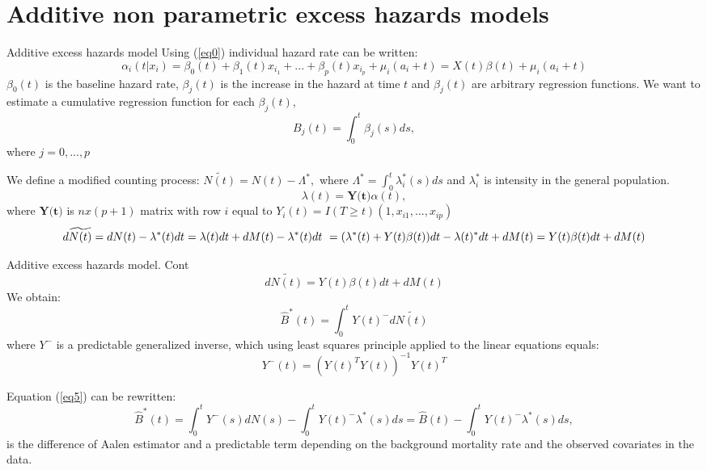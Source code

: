\documentclass{beamer}
\begin{document}
\section{Additive non parametric excess hazards models}
\begin{frame}{Additive excess hazards model}
Using (\ref{eq0}) individual hazard rate can be written:
$$\alpha_i(t|x_i) = \beta_0(t) + \beta_1(t)x_{i_1} + ... + \beta_p(t)x_{i_p} + \mu_i(a_i + t) = X(t)\beta(t) + \mu_i(a_i + t) $$
$\beta_0(t)$ is the baseline hazard rate, 
$\beta_j(t)$ is the increase in the hazard at time $t$
and $\beta_j(t)$ are arbitrary regression functions.
We want to estimate a cumulative regression function for each $\beta_j(t)$, $$B_j(t) = \int_0^t \beta_j(s)ds,$$ where $j=0,...,p$
\end{frame}

\begin{frame}
We define a modified counting process:
$\widetilde{N(t)} = N(t) - \Lambda^*,$ where
$\Lambda^* = \int_0^t \lambda_i^*(s)ds$ and $\lambda_i^*$ is intensity in the general population.
$$\lambda(t) = \textbf{Y(t)} \alpha(t),$$
where $\textbf{Y(t)}$ is $n x (p+1)$ matrix with row $i$ equal to $Y_i(t) = I(T \geq t)(1,x_{i1},...,x_{ip})$ 
\newline
$$d\widetilde{N(t)} = dN(t) - \lambda^*(t)dt = \lambda(t)dt + dM(t)- \lambda^*(t)dt \\\
= (\lambda^*(t) + Y(t)\beta(t))dt - \lambda(t)^*dt + dM(t) = Y(t)\beta(t)dt + dM(t)$$
\newline
\newline
\end{frame}

\begin{frame}{Additive excess hazards model. Cont}
$$d\widetilde{N(t)} = Y(t)\beta(t)dt + dM(t)$$
We obtain:
\begin{equation}
\label{eq5}
    \hat B^*(t) = \int_0^t Y(t)^{-}d\widetilde{N(t)}
\end{equation}
where $Y^{-}$ is a predictable generalized inverse, which using least squares principle applied to the linear equations equals:
$$Y^{-}(t) = (Y(t)^TY(t))^{-1}Y(t)^T $$
\end{frame}

\begin{frame}
Equation (\ref{eq5}) can be rewritten:
$$\hat B^*(t) = \int_0^t Y^-(s)dN(s) - \int_0^t Y(t)^{-}\lambda^*(s)ds
= \hat B(t) - \int_0^t Y(t)^{-}\lambda^*(s)ds,$$
 is the difference of Aalen estimator and a predictable term depending on the background mortality rate and the observed covariates in the data. 
   \end{frame}
\end{document}
